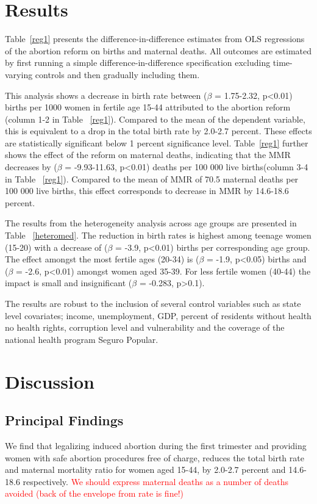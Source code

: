 \documentclass[a4paper, 11pt]{article}
\begin{document}
\begin{spacing}{1.5}
\begin{multicols}{2}
 
 \section{Results}
Table~\ref{reg1} presents the difference-in-difference estimates from OLS regressions of the abortion reform on births and maternal deaths. All outcomes are estimated by first running a simple difference-in-difference specification excluding time-varying controls and then gradually including them. 

This analysis shows a decrease in birth rate between ($\beta$ = 1.75-2.32, p<0.01) births per 1000 women in fertile age 15-44 attributed to the abortion reform (column 1-2 in Table ~\ref{reg1}). Compared to the mean of the dependent variable, this is equivalent to a drop in the total birth rate by 2.0-2.7 percent. These effects are statistically significant below 1 percent significance level. Table~\ref{reg1} further shows the effect of the reform on maternal deaths, indicating that the MMR decreases by ($\beta$ = -9.93-11.63, p<0.01)  deaths per 100 000 live births(column 3-4 in Table ~\ref{reg1}). Compared to the mean of MMR of 70.5 maternal deaths per 100 000 live births, this effect corresponds to decrease in MMR by 14.6-18.6 percent.

The results from the heterogeneity analysis across age groups are presented in Table ~\ref{heteromed}. The reduction in birth rates is highest among teenage women (15-20) with a decrease of ($\beta$ = -3.9, p<0.01) births per corresponding age group. The effect amongst the most fertile ages (20-34) is ($\beta$ = -1.9, p<0.05) births and  ($\beta$ = -2.6, p<0.01) amongst women aged 35-39. For less fertile women (40-44) the impact is small and insignificant ($\beta$ = -0.283, p>0.1).

The results are robust to the inclusion of several control variables such as state level covariates; income, unemployment, GDP, percent of residents without health no health rights, corruption level and vulnerability and the coverage of the national health program Seguro Popular.  
\section{Discussion}
\subsection{Principal Findings}
We find that legalizing induced abortion during the first trimester and providing women with safe abortion procedures free of charge, reduces the total birth rate and maternal mortality ratio for women aged 15-44, by 2.0-2.7 percent and 14.6-18.6 respectively.  \textcolor{red}{We should express maternal deaths as a number of deaths avoided (back of the envelope from rate is fine!)}


\end{multicols}
\end{spacing}
\end{document}
